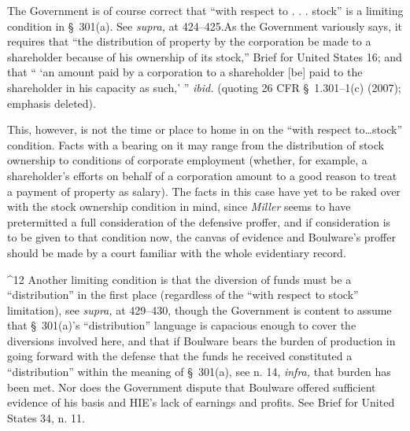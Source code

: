   The Government is of course correct that ``with respect to . .
. stock'' is a limiting condition in \S~301(a). See \emph{supra,}
at 424--425.\footnotemark[12] As the Government variously says, it requires
that ``the distribution of property by the corporation be made to
a shareholder because of his ownership of its stock,'' Brief for
United States 16; and that `` ‘an amount paid by a corporation to
a shareholder [be] paid to the shareholder in his capacity as such,'
'' \emph{ibid.} (quoting 26 CFR \S~1.301--1(c) (2007); emphasis
deleted).

  This, however, is not the time or place to home in on the ``with
respect to\dots stock'' condition. Facts with a bearing on it
may range from the distribution of stock ownership\footnotemark[13] \newpage 
to conditions of corporate employment (whether, for example, a
shareholder's efforts on behalf of a corporation amount to a good
reason to treat a payment of property as salary). The facts in this case
have yet to be raked over with the stock ownership condition in mind,
since \emph{Miller} seems to have pretermitted a full consideration of the
defensive proffer, and if consideration is to be given to that condition
now, the canvas of evidence and Boulware's proffer should be made by a
court familiar with the whole evidentiary record.\footnotemark[14]

^12 Another limiting condition is that the diversion of funds must be a
``distribution'' in the first place (regardless of the ``with respect
to stock'' limitation), see \emph{supra,} at 429--430, though the
Government is content to assume that \S~301(a)'s ``distribution''
language is capacious enough to cover the diversions involved here, and
that if Boulware bears the burden of production in going forward with
the defense that the funds he received constituted a ``distribution''
within the meaning of \S~301(a), see n. 14, \emph{infra,} that burden
has been met. Nor does the Government dispute that Boulware offered
sufficient evidence of his basis and HIE's lack of earnings and
profits. See Brief for United States 34, n. 11.

